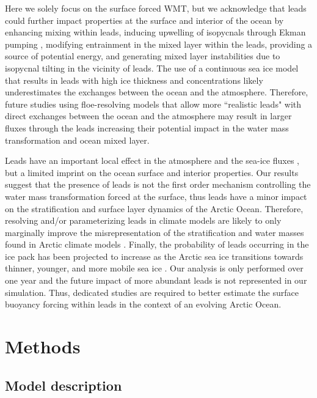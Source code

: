 \documentclass[lineno,sn-basic]{sn-jnl}%
\begin{document}
Here we solely focus on the surface forced WMT, but we acknowledge that leads could further impact properties at the surface and interior of the ocean by enhancing mixing within leads, inducing upwelling of isopycnals through Ekman pumping \citep{McPhee_LKF_2005}, modifying  entrainment in the mixed layer within the leads, providing a source of potential energy, and generating mixed layer instabilities due to isopycnal tilting in the vicinity of leads. The use of a continuous sea ice model that results in leads with high ice thickness and concentrations likely underestimates the exchanges between the ocean and the atmosphere. Therefore, future studies using floe-resolving models that allow more ``realistic leads" with direct exchanges between the ocean and the atmosphere may result in larger fluxes through the leads increasing their potential impact in the water mass transformation and ocean mixed layer.

Leads have an important local effect in the atmosphere and the sea-ice fluxes \citep{Marcq_flux_lead_2012, Lupkes_leads_2008, Wettlaufer_insulator_1997, Smith_polynyas_1990}, but a limited imprint on the ocean surface and interior properties. Our results suggest that the presence of leads is not the first order mechanism controlling the water mass transformation forced at the surface, thus leads have a minor impact on the stratification and surface layer dynamics of the Arctic Ocean.
Therefore, resolving and/or parameterizing leads in climate models are likely to only marginally improve the misrepresentation of the stratification and water masses found in Arctic climate models \citep{Wang_ompi_2024,Ilicak_core_2016}. Finally, the probability of leads occurring in the ice pack has been projected to increase as the Arctic sea ice transitions towards thinner, younger, and more mobile sea ice \citep{Boutin_rheology_2023, IPCC_arctic_2022}. Our analysis is only performed over one year and the future impact of more abundant leads is not represented in our simulation. Thus, dedicated studies are required to better estimate the surface buoyancy forcing within leads in the context of an evolving Arctic Ocean.

\section{Methods}
\subsection*{Model description}
\end{document}
